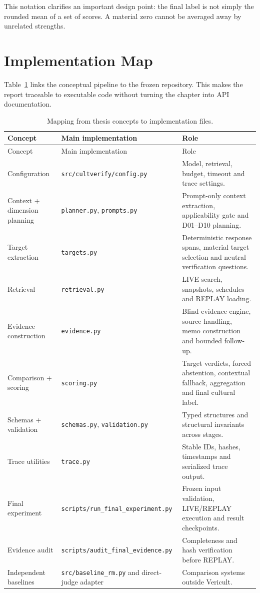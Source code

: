 This notation clarifies an important design point: the final label is not simply the rounded mean of a set of scores. A material zero cannot be averaged away by unrelated strengths.

\section{Implementation Map}

Table~\ref{tab:implementation-map} links the conceptual pipeline to the frozen repository. This makes the report traceable to executable code without turning the chapter into API documentation.

\begin{longtable}{p{}p{}p{}}
\caption{Mapping from thesis concepts to implementation files.}
\label{tab:implementation-map}\\
\toprule
Concept & Main implementation & Role \\
\midrule
\endfirsthead
\toprule
Concept & Main implementation & Role \\
\midrule
\endhead
Configuration & \texttt{src/cultverify/config.py} & Model, retrieval, budget, timeout and trace settings. \\
Context + dimension planning & \texttt{planner.py}, \texttt{prompts.py} & Prompt-only context extraction, applicability gate and D01--D10 planning. \\
Target extraction & \texttt{targets.py} & Deterministic response spans, material target selection and neutral verification questions. \\
Retrieval & \texttt{retrieval.py} & LIVE search, snapshots, schedules and REPLAY loading. \\
Evidence construction & \texttt{evidence.py} & Blind evidence engine, source handling, memo construction and bounded follow-up. \\
Comparison + scoring & \texttt{scoring.py} & Target verdicts, forced abstention, contextual fallback, aggregation and final cultural label. \\
Schemas + validation & \texttt{schemas.py}, \texttt{validation.py} & Typed structures and structural invariants across stages. \\
Trace utilities & \texttt{trace.py} & Stable IDs, hashes, timestamps and serialized trace output. \\
Final experiment & \texttt{scripts/run\_final\_experiment.py} & Frozen input validation, LIVE/REPLAY execution and result checkpoints. \\
Evidence audit & \texttt{scripts/audit\_final\_evidence.py} & Completeness and hash verification before REPLAY. \\
Independent baselines & \texttt{src/baseline\_rm.py} and direct-judge adapter & Comparison systems outside Vericult. \\
\bottomrule
\end{longtable}


